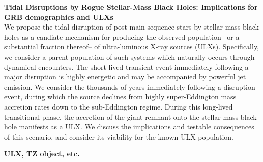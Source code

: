 {\bf Tidal Disruptions by Rogue Stellar-Mass Black Holes:  Implications for GRB demographics and ULXs}\\

We propose the tidal disruption of post main-sequence stars by stellar-mass black holes as a candiate mechanism for
producing the observed population --or a substantial fraction thereof-- of ultra-luminous X-ray sources (ULXs).   Specifically, we consider a parent population of such systems which naturally occurs through dynamical encounters.  The short-lived transient event immediately following a major disruption is highly energetic and may be 
accompanied by powerful jet emission.  We consider the thousands of years immediately following a disruption event, during which the source declines from highly super-Eddington mass accretion rates down to the sub-Eddington regime.  During this long-lived transitional phase, the accretion of the giant remnant onto the stellar-mass black hole manifests as a ULX.   We discuss the implications and testable consequences of this scenario, and consider its viability for the known ULX population.


{\bf ULX, TZ object, etc.}

